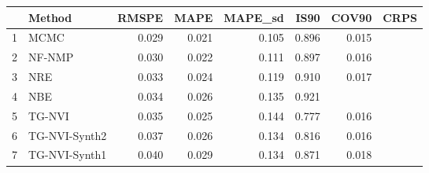 \documentclass[12pt]{article}
\begin{document}
\thispagestyle{empty}
\begin{table}[ht]
\centering
\begin{tabular}{rlrrrrrr}
  \hline
 & Method & RMSPE & MAPE & MAPE\_sd & IS90 & COV90 & CRPS \\ 
  \hline
1 & MCMC & 0.029 & 0.021 & 0.105 & 0.896 & 0.015 \\ 
  2 & NF-NMP & 0.030 & 0.022 & 0.111 & 0.897 & 0.016 \\ 
  3 & NRE & 0.033 & 0.024 & 0.119 & 0.910 & 0.017 \\ 
  4 & NBE & 0.034 & 0.026 & 0.135 & 0.921 &  \\ 
  5 & TG-NVI & 0.035 & 0.025 & 0.144 & 0.777 & 0.016 \\ 
  6 & TG-NVI-Synth2 & 0.037 & 0.026 & 0.134 & 0.816 & 0.016 \\ 
  7 & TG-NVI-Synth1 & 0.040 & 0.029 & 0.134 & 0.871 & 0.018 \\ 
   \hline
\end{tabular}
\end{table}
\end{document}

